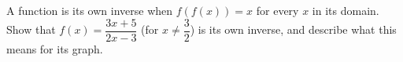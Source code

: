 A function is its own inverse when $f(f(x))=x$ for every $x$ in its domain. Show that $f(x)=\dfrac{3x+5}{2x-3}$ (for $x\ne\dfrac{3}{2}$) is its own inverse, and describe what this means for its graph.
